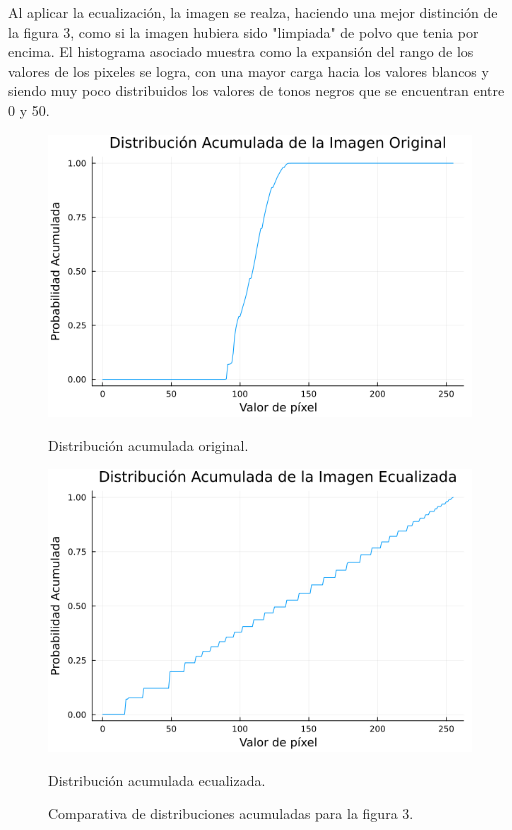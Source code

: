 \documentclass[11pt, letterpaper]{article}
\begin{document}
Al aplicar la ecualización, la imagen se realza, haciendo una mejor distinción de la figura 3, como si la imagen hubiera sido "limpiada" de polvo que tenia por encima. El histograma asociado muestra como la expansión del rango de los valores de los pixeles se logra, con una mayor carga hacia los valores blancos y siendo muy poco distribuidos los valores de tonos negros que se encuentran entre 0 y 50.

\begin{figure}[htbp]
	\centering
	\begin{minipage}{0.45\textwidth}
		\centering
		\includegraphics[width=\textwidth]{RESULTADOS/img32.png}
		\caption{Distribución acumulada original.}
		\label{fig:f21}
	\end{minipage}\hfill
	\begin{minipage}{0.45\textwidth}
		\centering
		\includegraphics[width=\textwidth]{RESULTADOS/img34.png}
		\caption{Distribución acumulada ecualizada.}
		\label{fig:f22}
	\end{minipage}
	\caption{Comparativa de distribuciones acumuladas para la figura 3.}
	\label{fig:R6}
\end{figure}
\end{document}
